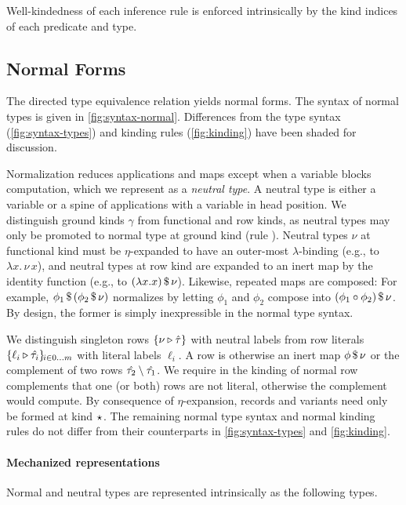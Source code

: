 \documentclass[sigplan,screen]{acmart}
\begin{document}
\Ni Well-kindedness of each inference rule is enforced intrinsically by the kind indices of each predicate and type.

\subsection{Normal Forms}
\label{sec:normal-forms}


The directed type equivalence relation yields normal forms. The syntax of normal types is given in \cref{fig:syntax-normal}. Differences from the type syntax (\cref{fig:syntax-types}) and kinding rules (\cref{fig:kinding}) have been shaded for discussion.



Normalization reduces applications and maps except when a variable blocks computation, which we represent as a \emph{neutral type}. A neutral type is either a variable or a spine of applications with a variable in head position. We distinguish ground kinds $\gamma$ from functional and row kinds, as neutral types may only be promoted to normal type at ground kind (rule ). Neutral types $\nu$ at functional kind must be $\eta$-expanded to have an outer-most $\lambda$-binding (e.g., to $\lambda x. \, \nu\, x$), and neutral types at row kind are expanded to an inert map by the identity function (e.g., to $\Mapp {(\lambda x. x)} {\nu}$). Likewise, repeated maps are composed: For example, $\Mapp {\phi_{1}} {(\Mapp {\phi_{2}} {\nu})}$ normalizes by letting $\phi_{1}$ and $\phi_{2}$ compose into $\Mapp {(\phi_{1} \circ \phi_{2})} \nu$. By design, the former is simply inexpressible in the normal type syntax.

We distinguish singleton rows $\{\LabTy \nu \Normal \tau\}$ with neutral labels from row literals $\RowIx i 0 m {\LabTy {\ell_i} {\Normal {\tau_i}}}$ with literal labels $\ell_i$. A row is otherwise an inert map $\Mapp \phi \nu$ or the complement of two rows $\Normal{\tau_2} \Compl \Normal{\tau_1}$. We require in the kinding of normal row complements \kruleNF{$\Compl$} that one (or both) rows are not literal, otherwise the complement would compute. By consequence of $\eta$-expansion, records and variants need only be formed at kind $\TypeK$. The remaining normal type syntax and normal kinding rules do not differ from their counterparts in \cref{fig:syntax-types} and \cref{fig:kinding}.

\paragraph{Mechanized representations } Normal and neutral types are represented intrinsically as the following types.
\end{document}
